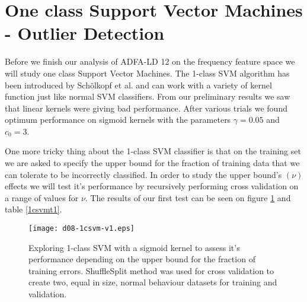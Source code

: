 \documentclass[reqno,openany,12pt]{amsbook}
\begin{document}
\section{One class Support Vector Machines - Outlier Detection}

Before we finish our analysis of ADFA-LD 12 on the frequency feature space we will study one class Support Vector Machines. The 1-class SVM algorithm has been introduced by Schölkopf et al.\cite{out4} and can work with a variety of kernel function just like normal SVM classifiers. From our preliminary results we saw that linear kernels were giving bad performance. After various trials we found optimum performance on sigmoid kernels with the parameters $\gamma = 0.05$ and $c_0 = 3$. 

One more tricky thing about the 1-class SVM classifier is that on the training set we are asked to specify the upper bound for the fraction of training data that we can tolerate to be incorrectly classified. In order to study the upper bound's $(\nu)$ effects we will test it's performance by recursively performing cross validation on a range of values for $\nu$. The results of our first test can be seen on figure \ref{1csvm-fr1} and table \ref{1csvmt1}.


\begin{figure}[th]
\texttt{[image: d08-1csvm-v1.eps]}
\caption[1-class SVM performance depending on bound for training errors]{Exploring 1-class SVM with a sigmoid kernel to assess it's performance depending on the upper bound for the fraction of training errors. ShuffleSplit method was used for cross validation to create two, equal in size, normal behaviour datasets for training and validation.}
\label{1csvm-fr1}
\end{figure}
\end{document}

